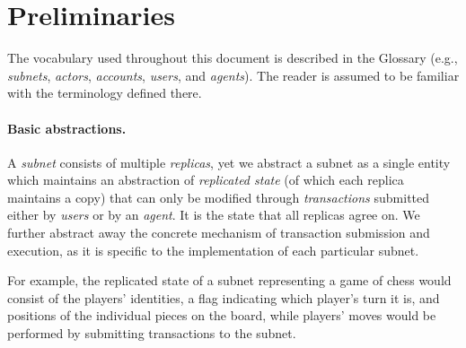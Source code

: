 \section{Preliminaries}
\label{sec:preliminaries}

The vocabulary used throughout this document is described in the Glossary \cite{glossary} (e.g., \emph{subnets}, \emph{actors}, \emph{accounts}, \emph{users}, and \emph{\ipc agents}).
The reader is assumed to be familiar with the terminology defined there.

\paragraph{Basic abstractions.}
A \emph{subnet} consists of multiple \emph{replicas}, yet we abstract a subnet as a single entity which maintains an  abstraction of \emph{replicated state} (of which each replica maintains a copy)
that can only be modified through \emph{transactions} submitted either by \emph{users} or by an \emph{\ipc agent}.
It is the state that all replicas agree on.
We further abstract away the concrete mechanism of transaction submission and execution, as it is specific to the implementation of each particular subnet.

For example, the replicated state of a subnet representing a game of chess would consist of the players' identities, a flag indicating which player's turn it is, and positions of the individual pieces on the board,
while players' moves would be performed by submitting transactions to the subnet.

